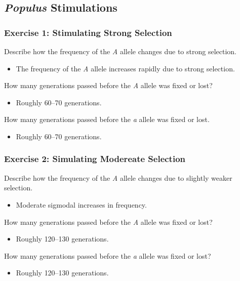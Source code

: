 \documentclass[12pt,a4paper]{article}
\begin{document}
\subsection{\textit{Populus} Stimulations}
\begin{enumerate}
    \subsubsection*{Exercise 1: Stimulating Strong Selection}
    {\color{darklc}\item  Describe how the frequency of the \textit{A} allele changes due to strong selection.}
        \begin{itemize}
            \item The frequency of the \textit{A} allele {\color{pos}increases rapidly} due to strong selection.
        \end{itemize}
    {\color{darklc}\item How many generations passed before the \textit{A} allele was fixed or lost?}
        \begin{itemize}
            \item Roughly {\color{o-Sun}60--70} generations.
        \end{itemize}
    {\color{darklc}\item How many generations passed before the \textit{a} allele was fixed or lost.}
        \begin{itemize}
            \item Roughly {\color{o-Sun}60--70} generations.
        \end{itemize}
    \subsubsection*{Exercise 2: Simulating Modereate Selection}
    {\color{darklc}\item Describe how the frequency of the \textit{A} allele changes due to slightly weaker selection.}
        \begin{itemize}
            \item Moderate sigmodal increases in frequency.
        \end{itemize}
    {\color{darklc}\item How many generations passed before the \textit{A} allele was fixed or lost?}
        \begin{itemize}
            \item Roughly {\color{o-Sun}120--130} generations.
        \end{itemize}
    {\color{darklc}\item How many generations passed before the \textit{a} allele was fixed or lost?}
        \begin{itemize}
            \item Roughly {\color{o-Sun}120--130} generations.
        \end{itemize}

\end{enumerate}
\end{document}
